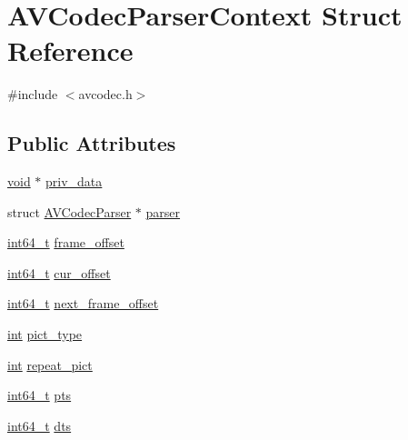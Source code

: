 \hypertarget{struct_a_v_codec_parser_context}{}\section{A\+V\+Codec\+Parser\+Context Struct Reference}
\label{struct_a_v_codec_parser_context}


{\ttfamily \#include $<$avcodec.\+h$>$}

\subsection*{Public Attributes}
\begin{DoxyCompactItemize}
\item 
\hyperlink{sound_8c_ae35f5844602719cf66324f4de2a658b3}{void} $\ast$ \hyperlink{struct_a_v_codec_parser_context_a50c37cbfe40edf7edb0fdf3644124eb8}{priv\+\_\+data}
\item 
struct \hyperlink{struct_a_v_codec_parser}{A\+V\+Codec\+Parser} $\ast$ \hyperlink{struct_a_v_codec_parser_context_a540286a805755b5b1f9d213f9f1d7109}{parser}
\item 
\hyperlink{lib-src_2ffmpeg_2win32_2stdint_8h_a67a9885ef4908cb72ce26d75b694386c}{int64\+\_\+t} \hyperlink{struct_a_v_codec_parser_context_ac3fc3d38b1f4e864535a9011ac2526e3}{frame\+\_\+offset}
\item 
\hyperlink{lib-src_2ffmpeg_2win32_2stdint_8h_a67a9885ef4908cb72ce26d75b694386c}{int64\+\_\+t} \hyperlink{struct_a_v_codec_parser_context_a03bee6c789b4ad1b8df27afd0658b0b1}{cur\+\_\+offset}
\item 
\hyperlink{lib-src_2ffmpeg_2win32_2stdint_8h_a67a9885ef4908cb72ce26d75b694386c}{int64\+\_\+t} \hyperlink{struct_a_v_codec_parser_context_ab4eda26dc96f26d2bb71b9a9c7d9a50c}{next\+\_\+frame\+\_\+offset}
\item 
\hyperlink{xmltok_8h_a5a0d4a5641ce434f1d23533f2b2e6653}{int} \hyperlink{struct_a_v_codec_parser_context_a41702bcd99e8aeab875634fb44bfd741}{pict\+\_\+type}
\item 
\hyperlink{xmltok_8h_a5a0d4a5641ce434f1d23533f2b2e6653}{int} \hyperlink{struct_a_v_codec_parser_context_a813780022f0a6abd1b7ab075264ffc3f}{repeat\+\_\+pict}
\item 
\hyperlink{lib-src_2ffmpeg_2win32_2stdint_8h_a67a9885ef4908cb72ce26d75b694386c}{int64\+\_\+t} \hyperlink{struct_a_v_codec_parser_context_a7e0b385e4ec6765ab0ae0db11565dd1d}{pts}
\item 
\hyperlink{lib-src_2ffmpeg_2win32_2stdint_8h_a67a9885ef4908cb72ce26d75b694386c}{int64\+\_\+t} \hyperlink{struct_a_v_codec_parser_context_ae3146f05127d9d4ba5a140a869bdab35}{dts}

\end{DoxyCompactItemize}
